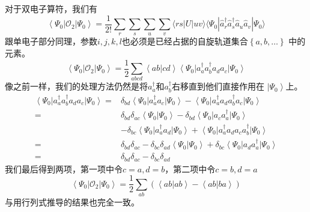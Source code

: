 \documentclass[12pt,a4paper,openany,twoside]{book}
\numberwithin{equation}{section}
\begin{document}
          对于双电子算符，我们有
          \begin{equation}
            \left\langle \Psi_0\right|\mathcal{O}_2\left|\Psi_0\right\rangle=\frac{1}{2!} \sum_{r} \sum_{s} \sum_{u} \sum_{v}\langle r s|U| u v\rangle \langle \Psi_0|\hat{a}_{r}^{\dagger} \hat{a}_{s}^{\dagger} \hat{a}_{u} \hat{a}_{v}|\Psi_0\rangle
          \end{equation}
          跟单电子部分同理，参数$i,j,k,l$也必须是已经占据的自旋轨道集合$\left\{a,b,\ldots\right\}$
          中的元素。
          \begin{equation}
            \left\langle \Psi_0\right|\mathcal{O}_2\left|\Psi_0\right\rangle=
            \frac{1}{2}\sum_{abcd}\left\langle ab\right.\left|cd\right\rangle
            \left\langle \Psi_0\right|a_a^\dagger a_b^\dagger a_d a_c \left|\Psi_0\right\rangle
          \end{equation}
          像之前一样，我们的处理方法仍然是将$a_a^\dagger$和$a_b^\dagger$右移直到他们直接作用在
          $\left|\Psi_0\right\rangle$上。
          \begin{equation}
            \begin{aligned}
              \left\langle \Psi_0\right|a_a^\dagger a_b^\dagger a_d a_c \left|\Psi_0\right\rangle=&\delta_{bd}\left\langle\Psi_0\right|a_a^\dagger a_c\left|\Psi_0\right\rangle-\left\langle \Psi_0\right|a_a^\dagger a_d a_b^\dagger a_c \left|\Psi_0\right\rangle\\
              =&\delta_{bd}\delta_{ac}\left\langle\Psi_0\right.\left|\Psi_0\right\rangle-\delta_{bd}\left\langle\Psi_0\right|a_c a_a^\dagger\left|\Psi_0\right\rangle\\
              &-\delta_{bc}\left\langle\Psi_0\right|a_a^\dagger a_d\left|\Psi_0\right\rangle+\left\langle \Psi_0\right|a_a^\dagger a_d a_c a_b^\dagger \left|\Psi_0\right\rangle\\
              =&\delta_{bd}\delta_{ac}-\delta_{bc}\delta_{ad}\left\langle\Psi_0\right.\left|\Psi_0\right\rangle+\delta_{bc}\left\langle\Psi_0\right|a_d a_a^\dagger\left|\Psi_0\right\rangle\\
              =&\delta_{bd}\delta_{ac}-\delta_{bc}\delta_{ad}
            \end{aligned}
          \end{equation}
          我们最后得到两项，第一项中令$c=a,d=b$，第二项中令$c=b,d=a$
          \begin{equation}
            \left\langle \Psi_0\right|\mathcal{O}_2\left|\Psi_0\right\rangle=
            \frac{1}{2}\sum_{ab}\left(\left\langle ab\right.\left|ab\right\rangle-
            \left\langle ab\right.\left|ba\right\rangle\right)
          \end{equation}
          与用行列式推导的结果也完全一致。
\end{document}
